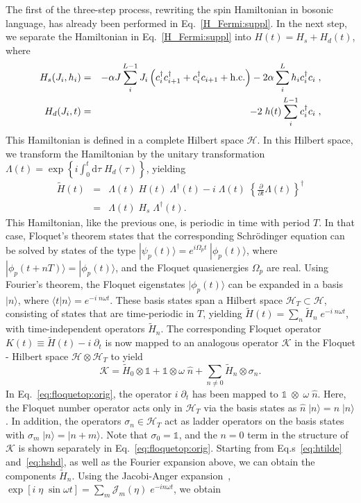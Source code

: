 \documentclass[aps,prl, notitlepage]{revtex4-1}
\begin{document}
The first of the three-step process, rewriting the spin Hamiltonian in bosonic language, has already been performed in Eq.~\ref{H_Fermi:suppl}. In the next step, we separate the Hamiltonian in Eq.~\ref{H_Fermi:suppl} into
$H(t) = H_s + H_d(t)$, where 
\begin{eqnarray} 
\label{eq:hshd}
H_s(J_i,h_i) &=& - \alpha J \sum_i^{L-1} J_i \left(c^{\dagger}_i c^{\dagger}_{i+1} + c^{\dagger}_i c_{i+1}  + {\rm h.c.}\right) 
    - 2 \alpha \sum_i^{L}  h_i c^{\dagger}_i c_i \; ,\nonumber \\
 H_d(J_i,t) &=& -2\; h(t)\sum_i^{L-1} c^{\dagger}_i c_i \; ,
\end{eqnarray}
This Hamiltonian is defined in a complete Hilbert space $\mathcal{H}$. In this Hilbert space, we transform the Hamiltonian by the unitary transformation $\Lambda(t) = \exp{\left\{i \int^t_0 \mathrm{d}\tau \; H_d(\tau)\right\}}$, yielding
\begin{eqnarray}
 \label{eq:htilde}
 \tilde{H}(t) &=& \Lambda(t)\; H(t)\; \Lambda^\dagger(t) - i \; \Lambda(t)\; \left\{\frac{\partial}{\partial t} \Lambda(t)\right\}^\dagger \nonumber \\
              &=& \Lambda(t)\; H_s\; \Lambda^\dagger(t).
\end{eqnarray}
This Hamiltonian, like the previous one, is periodic in time with period $T$. In that case, Floquet's theorem states that the corresponding Schr\"odinger equation can be solved by states of the type $|\psi_p (t) \rangle = e^{i \Omega_p t}\; |\phi_p(t)\rangle$, where $|\phi_p(t+nT)\rangle=|\phi_p(t)\rangle$, and the Floquet quasienergies $\Omega_p$ are real. Using Fourier's theorem, the Floquet eigenstates $|\phi_p(t)\rangle$ can be expanded in a basis $|n\rangle$, where $\langle t |n\rangle = e^{-i \; n\omega t}$. These basis states span a Hilbert space  $\mathcal{H}_T\subset \mathcal{H}$, consisting of states that are time-periodic in $T$, yielding $\tilde{H}(t) = \sum_n \tilde{H}_n\; e^{-i \; n\omega t}$, with
time-independent operators $\tilde{H}_n$. The corresponding Floquet operator $K(t)\equiv \tilde{H}(t)-i \;\partial_t$ is now mapped to an analogous operator $\mathcal{K}$ in the Floquet - Hilbert space  $\mathcal{H}\otimes\mathcal{H}_T$ to yield
\begin{equation}
\label{eq:floquetop:orig}
\mathcal{K} = \tilde{H}_0 \otimes \mathds{1} + \mathds{1}\otimes \omega \; \hat{n}  + \sum_{n\neq 0} \tilde{H}_n  \otimes \sigma_n.
\end{equation}
In Eq.~\ref{eq:floquetop:orig}, the operator $i \; \partial_t  $ has been mapped to $\mathds{1}\;\otimes\; \omega\; \hat{n}$. Here, the Floquet number operator acts only in $\mathcal{H}_T$ via the basis states as  $\hat{n} \; |n \rangle = n \;|n \rangle$. In addition, the operators $\sigma_n \in \mathcal{H}_T$ act as ladder operators on the basis states with $\sigma_m \; |n \rangle = |n +m\rangle$. Note that $\sigma_0 = \mathds{1}$, and the $n=0$ term in the structure of $\mathcal{K}$ is shown separately in Eq.~\ref{eq:floquetop:orig}. Starting from Eq.s~\ref{eq:htilde} and~\ref{eq:hshd}, as well as the Fourier expansion above, we can obtain the components $\tilde{H}_n$. Using the Jacobi-Anger expansion~\cite{watson}, $\exp{\left[i \; \eta \; \sin{\omega t}\right]}=\sum_m \mathcal{J}_m(\eta)\; e^{-i n \omega t}$, we obtain
\end{document}
